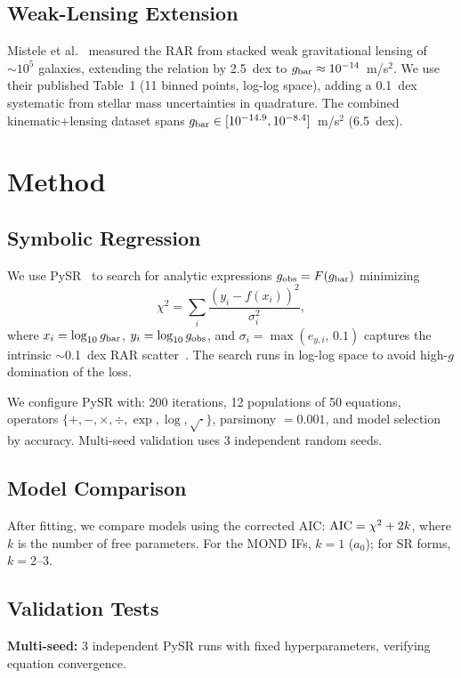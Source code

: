 \documentclass[twocolumn]{aastex631}
\begin{document}
\subsection{Weak-Lensing Extension}

Mistele et al.~\cite{mistele2024} measured the RAR from stacked weak
gravitational lensing of $\sim10^5$ galaxies, extending the relation by
2.5~dex to $g_{\rm bar} \approx 10^{-14}$~m/s$^2$.  We use their published
Table~1 (11 binned points, log-log space), adding a 0.1~dex systematic from
stellar mass uncertainties in quadrature.  The combined kinematic+lensing
dataset spans $g_{\rm bar} \in [10^{-14.9}, 10^{-8.4}]$~m/s$^2$ (6.5~dex).

\section{Method}

\subsection{Symbolic Regression}

We use PySR~\cite{pysr} to search for analytic expressions
$g_{\rm obs} = F(g_{\rm bar})$ minimizing
\[
\chi^2 = \sum_i \frac{(y_i - f(x_i))^2}{\sigma_i^2},
\]
where $x_i = \log_{10} g_{\rm bar}$, $y_i = \log_{10} g_{\rm obs}$, and
$\sigma_i = \max(e_{y,i},\, 0.1)$ captures the intrinsic $\sim$0.1~dex
RAR scatter~\cite{mcgaugh2016}.  The search runs in log-log space to avoid
high-$g$ domination of the loss.

We configure PySR with: 200 iterations, 12 populations of 50 equations,
operators $\{+,-,\times,\div,\exp,\log,\sqrt{\cdot}\}$, parsimony
$= 0.001$, and model selection by accuracy.  Multi-seed validation uses
3 independent random seeds.

\subsection{Model Comparison}

After fitting, we compare models using the corrected AIC:
${\rm AIC} = \chi^2 + 2k$, where $k$ is the number of free parameters.
For the MOND IFs, $k=1$ ($a_0$); for SR forms, $k=2$--3.

\subsection{Va\-li\-da\-tion Tests}

\textbf{Multi-seed:} 3 independent PySR runs with fixed hyperparameters,
verifying equation convergence.
\end{document}
